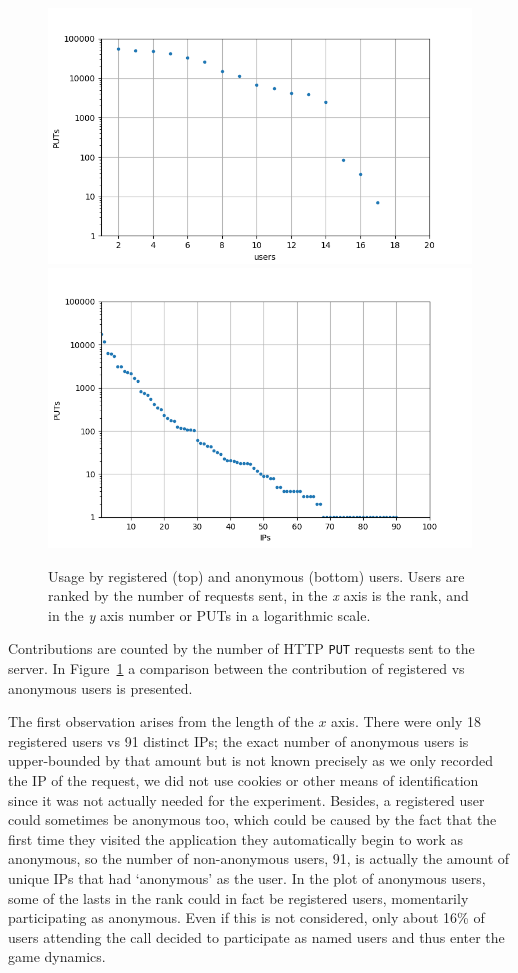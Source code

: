 \documentclass{llncs}
\begin{document}
\begin{figure}[h!tb]
    \centering
        \includegraphics[width=0.9\linewidth]{img/puts_user.png}
        \includegraphics[width=0.9\linewidth]{img/puts_ip.png}
    \caption{Usage by registered (top) and anonymous (bottom) users.  Users are ranked by
        the number of requests sent, in the \emph{x} axis is the rank, and in the \emph{y} axis
        number or PUTs in a logarithmic scale.}
      \label{fig:puts}
\end{figure}
%
Contributions are counted by the number of HTTP {\tt PUT} requests
sent to the server. In Figure~\ref{fig:puts} a comparison between the 
contribution of registered vs anonymous users is presented.

The first observation arises from the length of the $x$ axis. There
were only 18 registered users vs 91 distinct IPs; the 
exact number of anonymous users is upper-bounded by that amount but is
not known precisely as we only recorded the IP of the request, we did
not use cookies or other means of identification since it was not
actually needed for the experiment. Besides, a registered user
could sometimes be anonymous too, which could be caused by the fact that the first time they visited
the application they automatically begin to work as anonymous, so the
number of non-anonymous users, 91, is actually the amount of unique
IPs that had `anonymous' as the user. In the plot of 
anonymous users, some of the lasts in the rank could in fact be registered users,
momentarily participating as anonymous. Even if this is not considered, only
about 16\% of users attending the call decided to participate as named
users and thus enter the game dynamics. 
\end{document}
